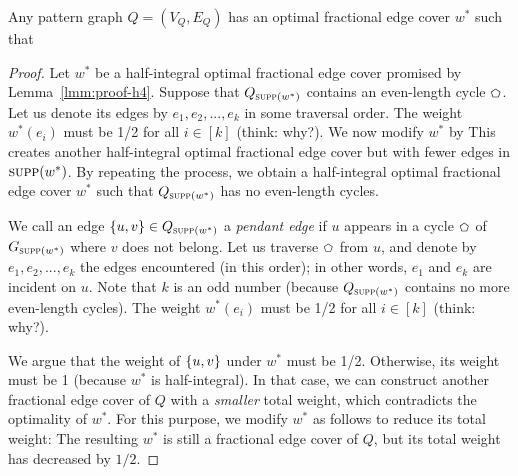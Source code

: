\begin{lemma} \label{lmm:proof-h5}
   Any pattern graph $Q = (V_Q, E_Q)$ has an optimal fractional edge cover $w^*$ such that
\end{lemma}

\begin{proof}
    Let $w^*$ be a half-integral optimal fractional edge cover promised by Lemma~\ref{lmm:proof-h4}. Suppose that $Q_{\textsc{supp}(w^*)}$ contains an even-length cycle $\mycycle$. Let us denote its edges by $e_1, e_2, ..., e_k$ in some traversal order. The weight $w^*(e_i)$ must be 1/2 for all $i \in [k]$ (think: why?). We now modify $w^*$ by
    This creates another half-integral optimal fractional edge cover but with fewer edges in $\textsc{supp}(w^*)$. By repeating the process, we obtain a half-integral optimal fractional edge cover $w^*$ such that $Q_{\textsc{supp}(w^*)}$ has no even-length cycles.

    \vgap

    We call an edge $\{u,v\} \in Q_{\textsc{supp}(w^*)}$ a {\em pendant edge} if $u$ appears in a cycle $\mycycle$ of $G_{\textsc{supp}(w^*)}$ where $v$ does not belong. Let us traverse $\mycycle$ from $u$, and denote by $e_1, e_2, ..., e_k$ the edges encountered (in this order); in other words, $e_1$ and $e_k$ are incident on $u$. Note that $k$ is an odd number (because $Q_{\textsc{supp}(w^*)}$ contains no more even-length cycles). The weight $w^*(e_i)$ must be 1/2 for all $i \in [k]$ (think: why?).

    \vgap

    We argue that the weight of $\{u,v\}$ under $w^*$ must be 1/2. Otherwise, its weight must be 1 (because $w^*$ is half-integral). In that case, we can construct another fractional edge cover of $Q$ with a {\em smaller} total weight, which contradicts the optimality of $w^*$. For this purpose, we modify $w^*$ as follows to reduce its total weight:
    The resulting $w^*$ is still a fractional edge cover of $Q$, but its total weight has decreased by $1/2$.


\end{proof}

